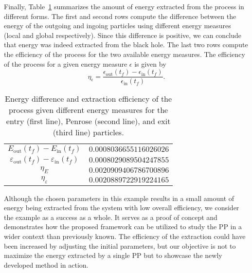 Finally, Table~\ref{tab:arbitrary_penrose_kerr_example_efficiency} summarizes the amount of energy extracted from the process in different forms. The first and second rows compute the difference between the energy of the outgoing and ingoing particles using different energy measures (local and global respectively). Since this difference is positive, we can conclude that energy was indeed extracted from the black hole. The last two rows compute the efficiency of the process for the two available energy measures. The efficiency of the process for a given energy measure $\epsilon$ is given by
%
\begin{equation}
  \eta_\epsilon = \frac{\epsilon_\text{out}(t_f) - \epsilon_\text{in}(t_f)}{\epsilon_\text{in}(t_f)}.
  \label{eq:arbitrary_penrose_kerr_example_efficiency_formula}
\end{equation}

\begin{table}[]
  \centering
  \begin{tabular}{cc}
    \hline\hline
    $E_\text{out}(t_f)-E_\text{in}(t_f)$                     & $0.0008036655116026026$ \\
    $\varepsilon_\text{out}(t_f)-\varepsilon_\text{in}(t_f)$ & $0.0008029089504247855$ \\
    $\eta_E$                                                 & $0.0020909406786700896$ \\
    $\eta_\varepsilon$                                       & $0.0020889722919224165$ \\ \hline\hline
  \end{tabular}
  \caption{Energy difference and extraction efficiency of the process given different energy measures for the entry (first line), Penrose (second line), and exit (third line) particles.}
  \label{tab:arbitrary_penrose_kerr_example_efficiency}
\end{table}

Although the chosen parameters in this example results in a small amount of energy being extracted from the system with low overall efficiency, we consider the example as a success as a whole. It serves as a proof of concept and demonstrates how the proposed framework can be utilized to study the \ac{PP} in a wider context than previously known. The efficiency of the extraction could have been increased by adjusting the initial parameters, but our objective is not to maximize the energy extracted by a single \ac{PP} but to showcase the newly developed method in action.